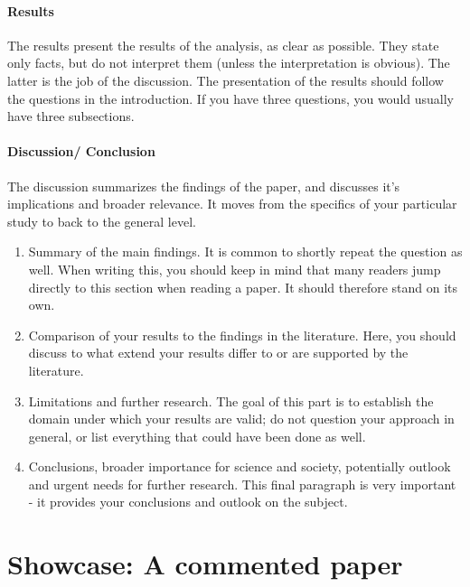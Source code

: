 \documentclass{tufte-book}
\begin{document}
\paragraph{Results} The results present the results of the analysis, as clear as possible. They state only facts, but do not interpret them (unless the interpretation is obvious). The latter is the job of the discussion. The presentation of the results should follow the questions in the introduction. If you have three questions, you would usually have three subsections.

\paragraph{Discussion/ Conclusion} The discussion summarizes the findings of the paper, and discusses it's implications and broader relevance. It moves from the specifics of your particular study to back to the general level.

\begin{enumerate}
\item Summary of the main findings. It is common to shortly repeat the question as well. When writing this, you should keep in mind that many readers jump directly to this section when reading a paper. It should therefore stand on its own.
\item Comparison of your results to the findings in the literature. Here, you should discuss to what extend your results differ to or are supported by the literature.
\item Limitations and further research. The goal of this part is to establish the domain under which your results are valid; do not question your approach in general, or list everything that could have been done as well.
\item Conclusions, broader importance for science and society, potentially outlook and urgent needs for further research. This final paragraph is very important - it provides your conclusions and outlook on the subject.
\end{enumerate}



\section{Showcase: A commented paper}
\end{document}
